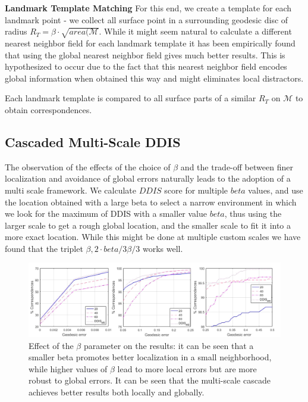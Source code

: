 \documentclass[10pt,twocolumn,letterpaper]{article}
\begin{document}
\textbf{Landmark Template Matching}
For this end, we create a template for each landmark point - we collect all surface point in a surrounding geodesic disc of radius $R_T=\beta\cdot\sqrt{area(\mathcal{M}}$. While it might seem natural to calculate a different nearest neighbor field for each landmark template it has been empirically found that using the global nearest neighbor field gives much better results. This is hypothesized to occur due to the fact that this nearest neighbor field encodes global information when obtained this way and might  eliminates local distractors.

Each landmark template is compared to all surface parts of a similar $R_T$ on $\mathcal{M}$ to obtain correspondences.


\subsection{Cascaded Multi-Scale DDIS}
The observation of the effects of the choice of $\beta$ and the trade-off between finer localization and avoidance of global errors naturally leads to the adoption of a multi scale framework. We calculate $DDIS$ score for multiple $beta$ values, and use the location obtained with a large beta to select a narrow environment in which we look for the maximum of DDIS with a smaller value $beta$, thus using the larger scale to get a rough global location, and the smaller scale to fit it into a more exact location. While this might be done at multiple custom scales we have found that the triplet $\beta ,2\cdot beta/3\beta/3$ works well.

\begin{figure}
	\centering
	\includegraphics[width=1\textwidth]{figures/AblationStudyThreshold.png}
	\caption{Effect of the $\beta$ parameter on the results: it can be seen that a smaller beta promotes better localization in a small neighborhood, while higher values of $\beta$ lead to more local errors but are more robust to global errors. It can be seen that the multi-scale cascade achieves better results both locally and globally.}
\end{figure}
\end{document}
